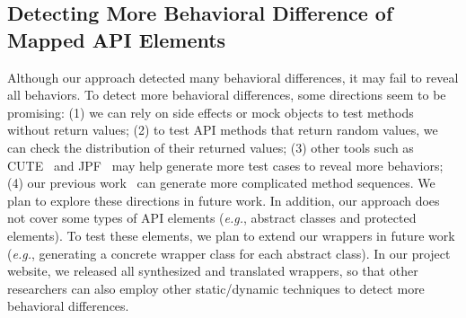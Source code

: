 \subsection{Detecting More Behavioral Difference of Mapped API Elements} Although our approach detected many behavioral differences, it may fail to reveal all behaviors. To detect more behavioral differences, some directions seem to be promising: (1) we can rely on side effects or  mock objects to test methods without return values; (2) to test API methods that return random values, we can check the distribution of their returned values; (3) other tools such as CUTE~\citep{koushik:cute} and JPF~\citep{visser2003mcp} may help generate more test cases to reveal more behaviors; (4) our previous work~\citep{thummalapenta09:mseqgen} can generate more complicated method sequences. We plan to explore these directions in future work. In addition, our approach does not cover some types of API elements (\emph{e.g.}, abstract classes and protected elements). To test these elements, we plan to extend our wrappers in future work (\emph{e.g.}, generating a concrete wrapper class for each abstract class). In our project website, we released all synthesized and translated wrappers, so that other researchers can also employ other static/dynamic techniques to detect more behavioral differences.



